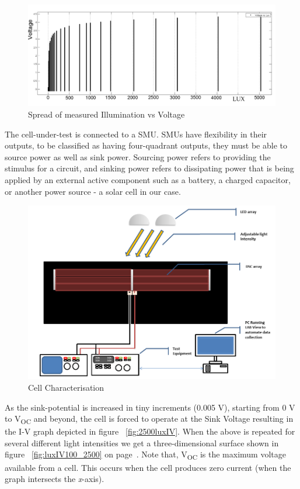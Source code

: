  \begin{figure}[H]
  \begin{center}
	\includegraphics[width=0.9\linewidth]{images/Voltagevlux}
	\caption{Spread of measured Illumination vs Voltage  }
	\label{fig:Voltagevlux}
  \end{center}
 \end{figure}
 The cell-under-test is connected to a \ac{SMU}. \ac{SMU}s have flexibility in their outputs, to be classified as having four-quadrant outputs, they must be able to source power as well as sink power. Sourcing power refers to providing the stimulus for a circuit, and sinking power refers to dissipating power that is being applied by an external active component such as a battery, a charged capacitor, or another power source \cite{NI_SMU} - a solar cell in our case.
 \begin{figure}[H]
	  \begin{center}
		  \includegraphics[width=\textwidth]{images/Cell_under_test}
		  \caption{Cell Characterisation }
		  \label{fig:Cell_U_test}
	  \end{center}
 \end{figure}
 As the sink-potential is increased in tiny increments (0.005 V), starting from  0 V to V\textsubscript{OC} and beyond, the cell is forced to operate at the Sink Voltage resulting in the I-V graph depicted in figure ~\ref{fig:2500luxIV}. When the above is repeated for several different light intensities we get a three-dimensional surface shown in figure ~\ref{fig:luxIV100_2500} on page~\pageref{fig:luxIV100_2500}. Note that, V\textsubscript{OC} is the maximum voltage available from a cell. This occurs when the cell produces zero current (when the graph intersects the \textit{x}-axis).\\
 
